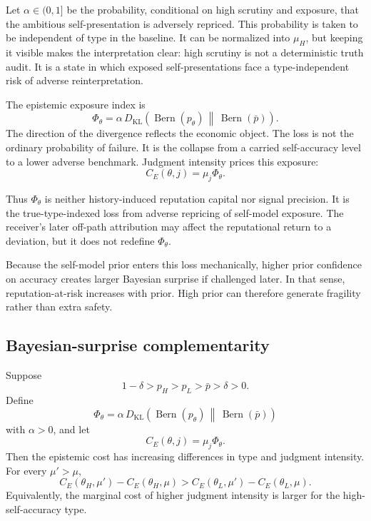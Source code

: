 Let $\alpha\in(0,1]$ be the probability, conditional on high scrutiny and exposure, that the ambitious self-presentation is adversely repriced. This probability is taken to be independent of type in the baseline. It can be normalized into $\mu_H$, but keeping it visible makes the interpretation clear: high scrutiny is not a deterministic truth audit. It is a state in which exposed self-presentations face a type-independent risk of adverse reinterpretation.

The epistemic exposure index is
\[
\Phi_\theta
=
\alpha\,
D_{\mathrm{KL}}
\left(
\operatorname{Bern}(p_\theta)
\,\middle\|\,
\operatorname{Bern}(\bar p)
\right).
\]
The direction of the divergence reflects the economic object. The loss is not the ordinary probability of failure. It is the collapse from a carried self-accuracy level to a lower adverse benchmark. Judgment intensity prices this exposure:
\[
C_E(\theta,j)=\mu_j\Phi_\theta.
\]

Thus $\Phi_\theta$ is neither history-induced reputation capital nor signal precision. It is the true-type-indexed loss from adverse repricing of self-model exposure. The receiver's later off-path attribution may affect the reputational return to a deviation, but it does not redefine $\Phi_\theta$.

Because the self-model prior enters this loss mechanically, higher prior confidence on accuracy creates larger Bayesian surprise if challenged later. In that sense, reputation-at-risk increases with prior. High prior can therefore generate fragility rather than extra safety.

\subsection{Bayesian-surprise complementarity}

\begin{lemma}
\label{lem:bayesian-surprise-complementarity}
Suppose
\[
1-\delta>p_H>p_L>\bar p>\delta>0.
\]
Define
\[
\Phi_\theta
=
\alpha\,
D_{\mathrm{KL}}
\left(
\operatorname{Bern}(p_\theta)
\,\middle\|\,
\operatorname{Bern}(\bar p)
\right)
\]
with $\alpha>0$, and let
\[
C_E(\theta,j)=\mu_j\Phi_\theta.
\]
Then the epistemic cost has increasing differences in type and judgment intensity. For every $\mu'>\mu$,
\[
C_E(\theta_H,\mu')-C_E(\theta_H,\mu)
>
C_E(\theta_L,\mu')-C_E(\theta_L,\mu).
\]
Equivalently, the marginal cost of higher judgment intensity is larger for the high-self-accuracy type.
\end{lemma}

